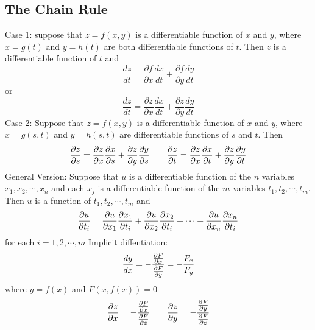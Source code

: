 \documentclass{article}
\begin{document}
    \subsection{The Chain Rule}
    \begin{outline}
        \1 Case 1: suppose that \(z=f(x,y)\) is a differentiable function of $x$ and $y$, where \(x=g(t)\) and \(y=h(t)\) are both differentiable functions of $t$. Then $z$ is a differentiable function of $t$ and \[\dfrac{dz}{dt}=\dfrac{\partial f}{\partial x}\dfrac{dx}{dt}+\dfrac{\partial f}{\partial y}\dfrac{dy}{dt}\] or \[\dfrac{dz}{dt}=\dfrac{\partial z}{\partial x}\dfrac{dx}{dt}+\dfrac{\partial z}{\partial y}\dfrac{dy}{dt}\]
        \1 Case 2: Suppose that \(z=f(x,y)\) is a differentiable function of $x$ and $y$, where \(x=g(s,t)\) and \(y=h(s,t)\) are differentiable functions of $s$ and $t$. Then \[\pdv{z}{s}=\pdv{z}{x}\pdv{x}{s}+\pdv{z}{y}\pdv{y}{s}\qquad\pdv{z}{t}=\pdv{z}{x}\pdv{x}{t}+\pdv{z}{y}\pdv{y}{t}\]
        \1 General Version: Suppose that $u$ is a differentiable function of the $n$ variables \(x_1,x_2,\cdots,x_n\) and each \(x_j\) is a differentiable function of the $m$ variables \(t_1,t_2,\cdots,t_m\). Then $u$ is a function of \(t_1,t_2,\cdots,t_m\) and \[\pdv{u}{t_i}=\pdv{u}{x_1}\pdv{x_1}{t_i}+\pdv{u}{x_2}\pdv{x_2}{t_i}+\cdots+\pdv{u}{x_n}\pdv{x_n}{t_i}\] for each \(i=1,2,\cdots,m\)
        \1 Implicit diffentiation: \[\dfrac{dy}{dx}=-\dfrac{\pdv{F}{x}}{\pdv{F}{y}}=-\dfrac{F_x}{F_y}\] where \(y=f(x)\) and \(F(x,f(x))=0\)
        \1 \[\pdv{z}{x}=-\dfrac{\pdv{F}{x}}{\pdv{F}{z}}\qquad\pdv{z}{y}=-\dfrac{\pdv{F}{y}}{\pdv{F}{z}}\]


    \end{outline}
\end{document}
